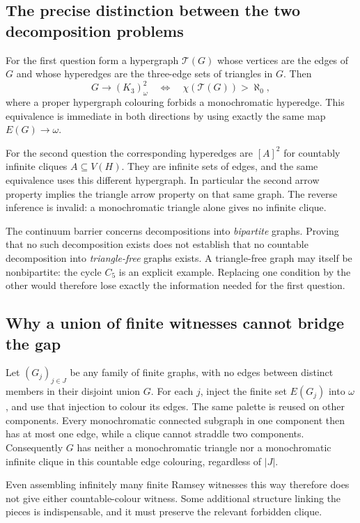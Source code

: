 \subsection{The precise distinction between the two decomposition problems}
For the first question form a hypergraph $\mathcal T(G)$ whose vertices are the edges of $G$ and whose hyperedges are the three-edge sets of triangles in $G$. Then
\[
G\to(K_3)^2_\omega
\quad\Longleftrightarrow\quad
\chi(\mathcal T(G))>\aleph_0,
\]
where a proper hypergraph colouring forbids a monochromatic hyperedge. This equivalence is immediate in both directions by using exactly the same map $E(G)\to\omega$.

For the second question the corresponding hyperedges are $[A]^2$ for countably infinite cliques $A\subseteq V(H)$. They are infinite sets of edges, and the same equivalence uses this different hypergraph. In particular the second arrow property implies the triangle arrow property on that same graph. The reverse inference is invalid: a monochromatic triangle alone gives no infinite clique.

The continuum barrier concerns decompositions into \emph{bipartite} graphs. Proving that no such decomposition exists does not establish that no countable decomposition into \emph{triangle-free} graphs exists. A triangle-free graph may itself be nonbipartite: the cycle $C_5$ is an explicit example. Replacing one condition by the other would therefore lose exactly the information needed for the first question.

\subsection{Why a union of finite witnesses cannot bridge the gap}
Let $(G_j)_{j\in J}$ be any family of finite graphs, with no edges between distinct members in their disjoint union $G$. For each $j$, inject the finite set $E(G_j)$ into $\omega$, and use that injection to colour its edges. The same palette is reused on other components. Every monochromatic connected subgraph in one component then has at most one edge, while a clique cannot straddle two components. Consequently $G$ has neither a monochromatic triangle nor a monochromatic infinite clique in this countable edge colouring, regardless of $|J|$.

Even assembling infinitely many finite Ramsey witnesses this way therefore does not give either countable-colour witness. Some additional structure linking the pieces is indispensable, and it must preserve the relevant forbidden clique.

